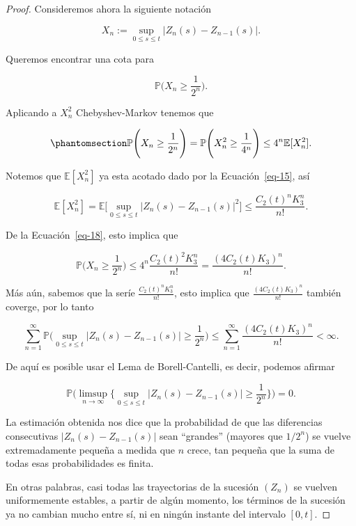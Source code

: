 \documentclass[
  spanish,
  us-letterpaper,
]{scrreprt}
\theoremstyle{plain}
\theoremstyle{plain}
\theoremstyle{definition}
\theoremstyle{plain}
\theoremstyle{remark}
\begin{document}
\begin{proof}
Consideremos ahora la siguiente notación

\[
    X_n:=\sup\limits_{0\leq s\leq t} |Z_n(s)-Z_{n-1}(s)|. 
\]

Queremos encontrar una cota para

\[
    \mathbb{P}\Bigg(X_n\geq\frac{1}{2^n}\Bigg).
\]

Aplicando a \(X_n^2\) Chebyshev-Markov tenemos que

\begin{equation}\phantomsection\label{eq-18}{
    \mathbb{P}\Bigg(X_n\geq\frac{1}{2^n}\Bigg)=\mathbb{P}\Bigg(X_n^2\geq \frac{1}{4^n}\Bigg)\leq 4^n\mathbb{E}[X_n^2].
}\end{equation}

Notemos que \(\mathbb{E}[X_n^2]\) ya esta acotado dado por la
Ecuación~\ref{eq-15}, así

\[
    \mathbb{E}[X_n^2]=\mathbb{E}\Bigg[\sup\limits_{0\leq s\leq t}|Z_n(s)-Z_{n-1}(s)|^2\Bigg]\leq \frac{C_2(t)^nK_3^n}{n!}.
\]

De la Ecuación~\ref{eq-18}, esto implica que

\[
    \mathbb{P}\Bigg(X_n\geq\frac{1}{2^n}\Bigg)\leq 4^n\frac{C_2(t)^2K_3^n}{n!}=\frac{(4C_2(t)K_3)^n}{n!}.
\]

Más aún, sabemos que la seríe
\(\displaystyle \frac{C_2(t)^nK_3^n}{n!}\), esto implica que
\(\displaystyle \frac{(4C_2(t)K_3)^n}{n!}\) también coverge, por lo
tanto

\[
    \sum\limits_{n=1}^{\infty} \mathbb{P}\Bigg(\sup\limits_{0\leq s\leq t}|Z_n(s)-Z_{n-1}(s)|\geq \frac{1}{2^n}\Bigg)\leq \sum\limits_{n=1}^{\infty} \frac{(4C_2(t)K_3)^n}{n!}<\infty.
\]

De aquí es posible usar el Lema de Borell-Cantelli, es decir, podemos
afirmar

\[
    \mathbb{P}\Bigg(\limsup\limits_{n\rightarrow \infty}\Bigg\{\sup\limits_{0\leq s\leq t}|Z_n(s)-Z_{n-1}(s)|\geq \frac{1}{2^n}\Bigg\}\Bigg)=0.
\]

La estimación obtenida nos dice que la probabilidad de que las
diferencias consecutivas \(|Z_n(s) - Z_{n-1}(s)|\) sean ``grandes''
(mayores que \(1/2^n\)) se vuelve extremadamente pequeña a medida que
\(n\) crece, tan pequeña que la suma de todas esas probabilidades es
finita.

En otras palabras, casi todas las trayectorias de la sucesión \((Z_n)\)
se vuelven uniformemente estables, a partir de algún momento, los
términos de la sucesión ya no cambian mucho entre sí, ni en ningún
instante del intervalo \([0,t]\).


\end{proof}
\end{document}
